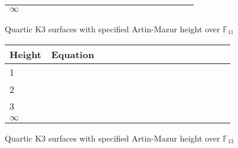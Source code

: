 \begin{figure}[h]
\begin{center}
\begin{tabular}{|p{0.1\linewidth}|p{0.8\linewidth}|}
			 \hline
			 \(\infty\)& \\
			 \hline 
		\end{tabular}
	\end{center}
	\caption{Quartic K3 surfaces with specified Artin-Mazur height over \(\mathbb{F}_{11}\)}
\end{figure}

\begin{figure}[h]
	\begin{center}
		\begin{tabular}{|p{0.1\linewidth}|p{0.8\linewidth}|}
			 \hline
			 Height & Equation \\
			 \hline
			 1 & \\
			 \hline 
			 2 & \\
			 \hline 
			 3 & \\
             \hline
			 \(\infty\)& \\
			 \hline 
		\end{tabular}
	\end{center}
	\caption{Quartic K3 surfaces with specified Artin-Mazur height over \(\mathbb{F}_{13}\)}
\end{figure}
